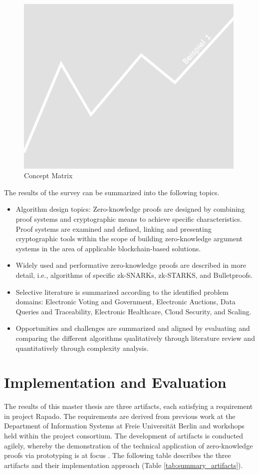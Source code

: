 \begin{figure}[hbt]
	\centering
		\includegraphics[width=0.99\textwidth]{Pictures/bsp1.png}
	\caption{Concept Matrix}
	\label{fig:concept_matrix}
\end{figure}

The results of the survey can be summarized into the following topics. 
\begin{itemize}
    \item Algorithm design topics: Zero-knowledge proofs are designed by combining proof systems and cryptographic means to achieve specific characteristics. Proof systems are examined and defined, linking and presenting cryptographic tools within the scope of building zero-knowledge argument systems in the area of applicable blockchain-based solutions.
    \item Widely used and performative zero-knowledge proofs are described in more detail, i.e., algorithms of specific zk-SNARKs, zk-STARKS, and Bulletproofs.
    \item Selective literature is summarized according to the identified problem domains: Electronic Voting and Government, Electronic Auctions, Data Queries and Traceability, Electronic Healthcare, Cloud Security, and Scaling.
    \item Opportunities and challenges are summarized and aligned by evaluating and comparing the different algorithms qualitatively through literature review and quantitatively through complexity analysis.
\end{itemize}

\section{Implementation and Evaluation}
The results of this master thesis are three artifacts, each satisfying a requirement in project Rapado. The requirements are derived from previous work at the Department of Information Systems at Freie Universit{\"a}t Berlin and workshops held within the project consortium. The development of artifacts is conducted agilely, whereby the demonstration of the technical application of zero-knowledge proofs via prototyping is at focus \citep{mci/Wilde2007}. The following table describes the three artifacts and their implementation approach (Table \ref{tab:summary_artifacts}). 

